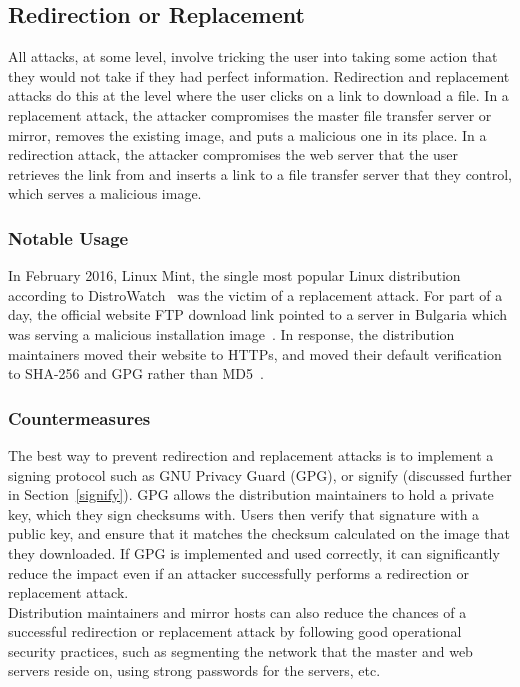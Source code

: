 \documentclass[conference]{IEEEtran}
\begin{document}
\subsection{Redirection or Replacement}

All attacks, at some level, involve tricking the user into taking some action that they would
not take if they had perfect information. Redirection and replacement attacks do this at the
level where the user clicks on a link to download a file. In a replacement attack, the attacker
compromises the master file transfer server or mirror, removes the existing image, and puts a
malicious one in its place. In a redirection attack, the attacker compromises the web server
that the user retrieves the link from and inserts a link to a file transfer server that they
control, which serves a malicious image.

\subsubsection{Notable Usage}

In February 2016, Linux Mint, the single most popular Linux distribution according to DistroWatch~\cite{DistroWatch} was the victim of a replacement attack. For part of a day, the official website FTP download link pointed to a server in Bulgaria which was serving a malicious installation image~\cite{mintblog}. In response, the distribution maintainers moved their website to HTTPs, and moved their default verification to SHA-256 and GPG rather than MD5~\cite{mintnews}.

\subsubsection{Countermeasures}

The best way to prevent redirection and replacement attacks is to implement a signing protocol such as GNU Privacy Guard (GPG), or signify (discussed further in Section~\ref{signify}). GPG allows the distribution maintainers to hold a private key, which they sign checksums with. Users then verify that signature with a public key, and ensure that it matches the checksum calculated on the image that they downloaded. If GPG is implemented and used correctly, it can significantly reduce the impact even if an attacker successfully performs a redirection or replacement attack.\\
\indent Distribution maintainers and mirror hosts can also reduce the chances of a successful redirection or replacement attack by following good operational security practices, such as segmenting the network that the master and web servers reside on, using strong passwords for the servers, etc.
\end{document}
